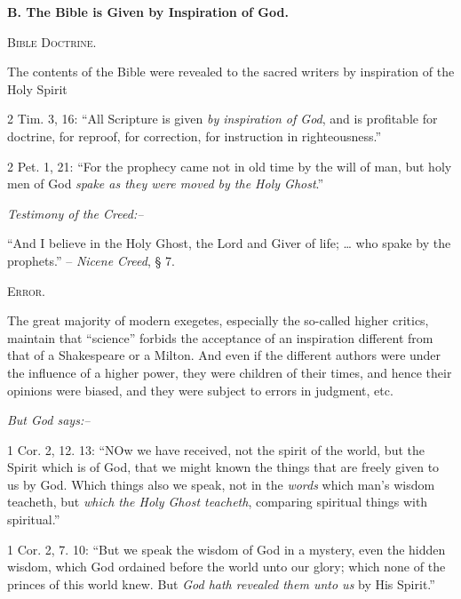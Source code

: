 \documentclass[
]{book}
\begin{document}
\begin{center}
\textbf{B.  The Bible is Given by Inspiration of God.}

\textsc{Bible Doctrine.}
\end{center}

The contents of the Bible were revealed to the sacred writers by inspiration of the Holy Spirit

2 Tim. 3, 16: ``All Scripture is given \emph{by inspiration of God}, and is profitable for doctrine, for reproof, for correction, for instruction in righteousness.''

2 Pet. 1, 21: ``For the prophecy came not in old time by the will of man, but holy men of God \emph{spake as they were moved by the Holy Ghost}.''

\begin{center}
\textsl{Testimony of the Creed:--}
\end{center}

``And I believe in the Holy Ghost, the Lord and Giver of life; \ldots{} who spake by the prophets.'' -- \emph{Nicene Creed}, § 7.

\begin{center}
\textsc{Error.}
\end{center}

The great majority of modern exegetes, especially the so-called higher critics, maintain that ``science'' forbids the acceptance of an inspiration different from that of a Shakespeare or a Milton. And even if the different authors were under the influence of a higher power, they were children of their times, and hence their opinions were biased, and they were subject to errors in judgment, etc.

\begin{center}
\textsl{But God says:--}
\end{center}

1 Cor. 2, 12. 13: ``NOw we have received, not the spirit of the world, but the Spirit which is of God, that we might known the things that are freely given to us by God. Which things also we speak, not in the \emph{words} which man's wisdom teacheth, but \emph{which the Holy Ghost teacheth}, comparing spiritual things with spiritual.''

1 Cor. 2, 7. 10: ``But we speak the wisdom of God in a mystery, even the hidden wisdom, which God ordained before the world unto our glory; which none of the princes of this world knew. But \emph{God hath revealed them unto us} by His Spirit.''
\end{document}
